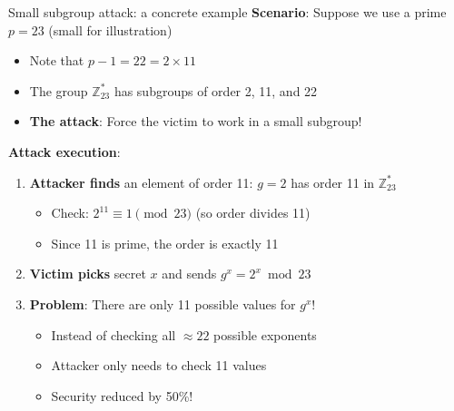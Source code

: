 \documentclass[aspectratio=169, lualatex, handout]{beamer}
\begin{document}
\begin{frame}{Small subgroup attack: a concrete example}
	\textbf{Scenario}: Suppose we use a prime $p = 23$ (small for illustration)
	\begin{itemize}[<+->]
		\item Note that $p - 1 = 22 = 2 \times 11$
		\item The group $\mathbb{Z}_{23}^*$ has subgroups of order 2, 11, and 22
		\item \textbf{The attack}: Force the victim to work in a small subgroup!
	\end{itemize}
	\vspace{0.5cm}
	\textbf{Attack execution}:
	\begin{enumerate}[<+->]
		\item \textbf{Attacker finds} an element of order 11: $g = 2$ has order 11 in $\mathbb{Z}_{23}^*$
		      \begin{itemize}
			      \item Check: $2^{11} \equiv 1 \pmod{23}$ (so order divides 11)
			      \item Since 11 is prime, the order is exactly 11
		      \end{itemize}
		\item \textbf{Victim picks} secret $x$ and sends $g^x = 2^x \bmod 23$
		\item \textbf{Problem}: There are only 11 possible values for $g^x$!
		      \begin{itemize}
			      \item Instead of checking all $\approx 22$ possible exponents
			      \item Attacker only needs to check 11 values
			      \item Security reduced by 50\%!
		      \end{itemize}
	\end{enumerate}
\end{frame}
\end{document}
